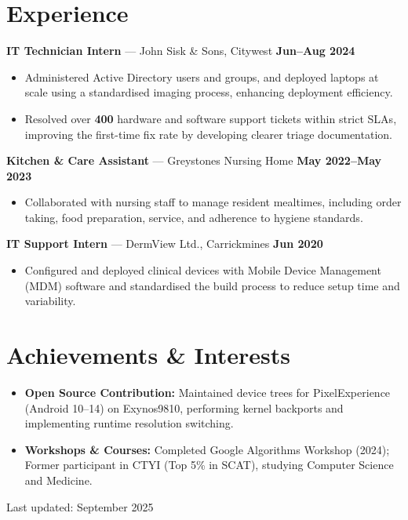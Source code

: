 \documentclass[10pt,a4paper]{article}
\begin{document}
\section*{Experience}
\textbf{IT Technician Intern} --- John Sisk \& Sons, Citywest \hfill \textbf{Jun--Aug 2024}
\begin{itemize}
    \item Administered Active Directory users and groups, and deployed laptops at scale using a standardised imaging process, enhancing deployment efficiency.
    \item Resolved over \textbf{400} hardware and software support tickets within strict SLAs, improving the first-time fix rate by developing clearer triage documentation.
\end{itemize}
\medskip
\textbf{Kitchen \& Care Assistant} --- Greystones Nursing Home \hfill \textbf{May 2022--May 2023}
\begin{itemize}
    \item Collaborated with nursing staff to manage resident mealtimes, including order taking, food preparation, service, and adherence to hygiene standards.
\end{itemize}
\medskip
\textbf{IT Support Intern} --- DermView Ltd., Carrickmines \hfill \textbf{Jun 2020}
\begin{itemize}
    \item Configured and deployed clinical devices with Mobile Device Management (MDM) software and standardised the build process to reduce setup time and variability.
\end{itemize}


\section*{Achievements \& Interests}
\begin{itemize}
    \item \textbf{Open Source Contribution:} Maintained device trees for PixelExperience (Android 10--14) on Exynos9810, performing kernel backports and implementing runtime resolution switching.
    \item \textbf{Workshops \& Courses:} Completed Google Algorithms Workshop (2024); Former participant in CTYI (Top 5\% in SCAT), studying Computer Science and Medicine.
\end{itemize}

\vfill
\begin{center}
    \small Last updated: September 2025
\end{center}
\end{document}
